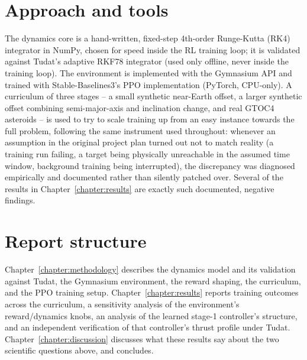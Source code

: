 \section{Approach and tools}

The dynamics core is a hand-written, fixed-step 4th-order Runge-Kutta (RK4) integrator in NumPy,
chosen for speed inside the RL training loop; it is validated against Tudat's adaptive RKF78
integrator (used only offline, never inside the training loop). The environment is implemented
with the Gymnasium API and trained with Stable-Baselines3's PPO implementation (PyTorch, CPU-only).
A curriculum of three stages -- a small synthetic near-Earth offset, a larger synthetic offset
combining semi-major-axis and inclination change, and real GTOC4 asteroids -- is used to try to
scale training up from an easy instance towards the full problem, following the same instrument
used throughout: whenever an assumption in the original project plan turned out not to match
reality (a training run failing, a target being physically unreachable in the assumed time
window, background training being interrupted), the discrepancy was diagnosed empirically and
documented rather than silently patched over. Several of the results in Chapter~\ref{chapter:results}
are exactly such documented, negative findings.

\section{Report structure}

Chapter~\ref{chapter:methodology} describes the dynamics model and its validation against Tudat,
the Gymnasium environment, the reward shaping, the curriculum, and the PPO training setup.
Chapter~\ref{chapter:results} reports training outcomes across the curriculum, a sensitivity
analysis of the environment's reward/dynamics knobs, an analysis of the learned stage-1
controller's structure, and an independent verification of that controller's thrust profile
under Tudat. Chapter~\ref{chapter:discussion} discusses what these results say about the two
scientific questions above, and concludes.
